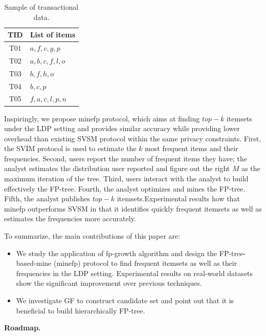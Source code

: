 \documentclass[conference]{IEEEtran}
\begin{document}
\begin{table}[htbp]
\caption{{\color{red}Sample of transactional data.}}
\begin{center}
\begin{tabular}{|c|l|}\hline
  TID&List of items \\\hline
  T01&$a,f,c,g,p$ \\\hline
  T02&$a,b,c,f,l,o$ \\\hline
  T03&$b,f,h,o$ \\\hline
  T04&$b,c,p$ \\\hline
  T05&$f,a,c,l,p,n$ \\\hline
\end{tabular}
\label{trans table}
\end{center}
\end{table}

Inspiringly, we propose {\color{red}minefp} protocol, which aims at finding $top-k$ itemsets under the LDP setting and provides similar accuracy while providing lower overhead than existing SVSM protocol within the same privacy constraints.
First, the SVIM protocol is used to estimate the $k$ most frequent items and their frequencies. Second, users report the number of frequent items they have; the analyst estimates the distribution user reported and figure out the right $M$ as the maximum iteration of the tree. Third, users interact with the analyst to build effectively the FP-tree\cite{fp}. Fourth, the analyst optimizes and mines the FP-tree. Fifth, the analyst publishes $top-k$ itemsets.Experimental results how that {\color{red}minefp
outperforms SVSM in that it identifies quickly frequent itemsets as well as estimates the frequencies more accurately.}

{\color{red}
To summarize, the main contributions of this paper are:
\begin{itemize}
\item We study the application of fp-growth algorithm and design the FP-tree-based-mine (minefp) protocol to find frequent itemsets as well as their frequencies in the LDP setting. Experimental results on real-world datasets show the significant improvement over previous techniques.
\item We investigate GF to construct candidate set and point out that it is beneficial to build hierarchically FP-tree. 
\end{itemize}
}


\textbf{Roadmap.}
\end{document}
